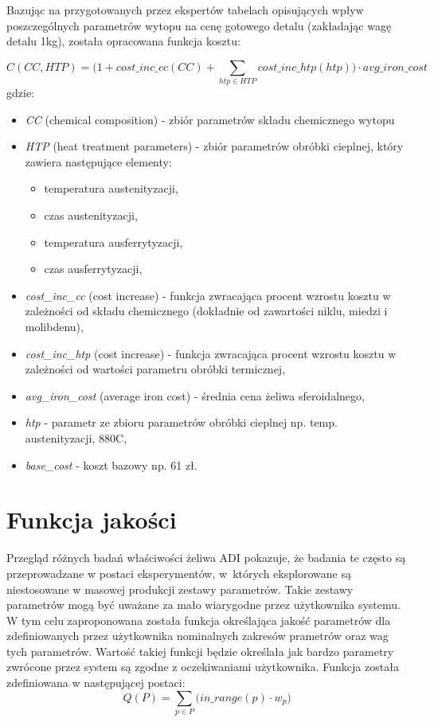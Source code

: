 Bazując na przygotowanych przez ekspertów tabelach opisujących wpływ poszczególnych parametrów wytopu na cenę gotowego detalu (zakładając wagę detalu 1kg), została opracowana funkcja kosztu:

\begin{equation}
   C(CC, HTP) = \Big(1+cost\_inc\_cc(CC) + \sum_{htp \in HTP} cost\_inc\_htp(htp)\Big) \cdot avg\_iron\_cost 
\end{equation}
gdzie:
\begin{itemize}
    \item \textit{CC} (chemical composition) - zbiór parametrów składu chemicznego wytopu
    \item \textit{HTP} (heat treatment parameters) - zbiór parametrów obróbki cieplnej, który zawiera następujące elementy:
    \begin{itemize}
        \item temperatura austenityzacji,
        \item czas austenityzacji,
        \item temperatura ausferrytyzacji,
        \item czas ausferrytyzacji,
    \end{itemize}
    \item \textit{cost\_inc\_cc} (cost increase) - funkcja zwracająca procent wzrostu kosztu w zależności od składu chemicznego (dokładnie od zawartości niklu, miedzi i molibdenu),
    \item \textit{cost\_inc\_htp} (cost increase) - funkcja zwracająca procent wzrostu kosztu w zależności od wartości parametru obróbki termicznej,
    \item \textit{avg\_iron\_cost} (average iron cost) - średnia cena żeliwa sferoidalnego,
    \item \textit{htp} - parametr ze zbioru parametrów obróbki cieplnej np. temp. austenityzacji, 880\degree C,
    \item \textit{base\_cost} - koszt bazowy np. 61 zł.
\end{itemize}

\section{Funkcja jakości}
Przegląd różnych badań właściwości żeliwa ADI pokazuje, że badania te często są przeprowadzane w postaci eksperymentów, w~których eksplorowane są niestosowane w masowej produkcji zestawy parametrów. Takie zestawy parametrów mogą być uważane za mało wiarygodne przez użytkownika systemu. W tym celu zaproponowana została funkcja określająca jakość parametrów dla zdefiniowanych przez użytkownika nominalnych zakresów prametrów oraz wag tych parametrów. Wartość takiej funkcji będzie określała jak bardzo parametry zwrócone przez system są zgodne z oczekiwaniami użytkownika. Funkcja została zdefiniowana w następującej postaci:
\begin{equation}
     Q(P) = \sum_{p \in P} \big(in\_range(p) \cdot w_p\big) 
\end{equation}

